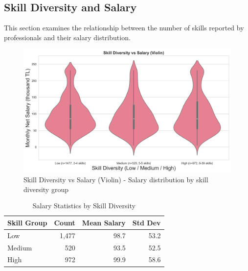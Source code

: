 \documentclass[12pt,a4paper]{article}
\begin{document}
\subsection{Skill Diversity and Salary}
This section examines the relationship between the number of skills reported by professionals and their salary distribution.

\begin{figure}[H]
	\centering
	\includegraphics[width=\textwidth]{figures/violin_skill_diversity.png}
	\caption{Skill Diversity vs Salary (Violin) - Salary distribution by skill diversity group}
\end{figure}

\begin{table}[H]
	\centering
	\small
	\begin{tabular}{lrrr}
		\toprule
		\textbf{Skill Group} & \textbf{Count} & \textbf{Mean Salary} & \textbf{Std Dev} \\
		\midrule
		Low                  & 1,477          & 98.7                 & 53.2             \\
		Medium               & 520            & 93.5                 & 52.5             \\
		High                 & 972            & 99.9                 & 58.6             \\
		\bottomrule
	\end{tabular}
	\caption{Salary Statistics by Skill Diversity}
\end{table}
\end{document}
